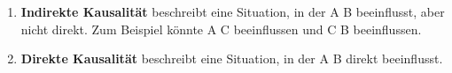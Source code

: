 \begin{mydefinition}[Kausalität]
\begin{enumerate}
    \item \textbf{Indirekte Kausalität} beschreibt eine Situation, in der A B beeinflusst, aber nicht direkt. Zum Beispiel könnte A C beeinflussen und C B beeinflussen.
          \begin{center}
          \end{center}

    \item \textbf{Direkte Kausalität} beschreibt eine Situation, in der A B direkt beeinflusst.
          \begin{center}
          \end{center}
\end{enumerate}
\end{mydefinition}

